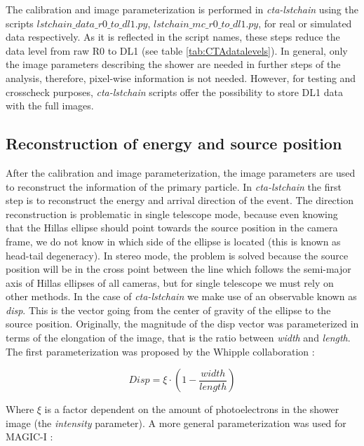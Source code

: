 \documentclass[main.tex]{subfiles}
\begin{document}
The calibration and image parameterization is performed in \textit{cta-lstchain} using the scripts \textit{$lstchain\_data\_r0\_to\_dl1.py$}, \textit{$lstchain\_mc\_r0\_to\_dl1.py$}, for real or simulated data respectively. As it is reflected in the script names, these steps reduce the data level from raw R0 to DL1 (see table \ref{tab:CTAdatalevels}). In general, only the image parameters describing the shower are needed in further steps of the analysis, therefore, pixel-wise information is not needed. However, for testing and crosscheck purposes, \textit{cta-lstchain} scripts offer the possibility to store DL1 data with the full images.

\subsection{Reconstruction of energy and source position} \label{sec:recoe}

After the calibration and image parameterization, the image parameters are used to reconstruct the information of the primary particle. In \textit{cta-lstchain} the first step is to reconstruct the energy and arrival direction of the event.
The direction reconstruction is problematic in single telescope mode, because even knowing that the Hillas ellipse should point towards the source position in the camera frame, we do not know in which side of the ellipse is located (this is known as head-tail degeneracy). In stereo mode, the problem is solved because the source position will be in the cross point between the line which follows the semi-major axis of Hillas ellipses of all cameras, but for single telescope we must rely on other methods. In the case of \textit{cta-lstchain} we make use of an observable known as \textit{disp}. This is the vector going from the center of gravity of the ellipse to the source position.
Originally, the magnitude of the disp vector was parameterized in terms of the elongation of the image, that is the ratio between \textit{width} and \textit{length}. The first parameterization was proposed by the Whipple collaboration \cite{1994dispwhipple}:

\begin{equation}
  Disp = \xi \cdot \left(1 - \frac{width}{length}  \right)
\end{equation}

Where $\xi$ is a factor dependent on the amount of photoelectrons in the shower image (the \textit{intensity} parameter). A more general parameterization was used for MAGIC-I \cite{2005DISPmagic}:
\end{document}
